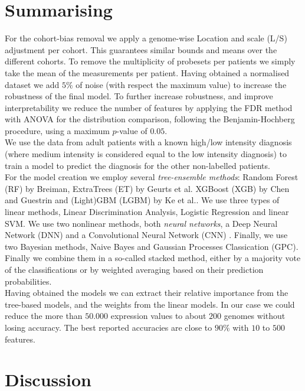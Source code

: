 \documentclass[a4paper,10pt]{article}
\begin{document}
\section{Summarising}
%
For the cohort-bias removal we apply a genome-wise Location and scale (L/S) adjustment per cohort. This guarantees similar bounds and means over the different cohorts. To remove the multiplicity of probesets per patients we simply take the mean of the measurements per patient. Having obtained a normalised dataset we add $5\%$ of noise (with respect the maximum value) to increase the robustness of the final model. To further increase robustness, and improve interpretability we reduce the number of features by applying the FDR method with ANOVA for the distribution comparison, following the Benjamin-Hochberg procedure, using a maximum $p$-value of $0.05$. \\
%
We use the data from adult patients with a known high/low intensity diagnosis (where medium intensity is considered equal to the low intensity diagnosis) to train a model to predict the diagnosis for the other non-labelled patients. \\
%
For the model creation we employ several \textit{tree-ensemble methods}: Random Forest (RF) by Breiman\cite{Breiman2001}, ExtraTrees (ET) by Geurts et al.\cite{Geurts2006} XGBoost (XGB) by Chen and Guestrin\cite{Chen2016} and (Light)GBM (LGBM) by Ke et al.\cite{Ke2017}. 
We use three types of linear methods, Linear Discrimination Analysis, Logistic Regression and linear SVM.
We use two nonlinear methods, both \textit{neural networks}, a Deep Neural Network (DNN) \cite{lecun2015deep} and a Convolutional Neural Network (CNN) \cite{Lecun98}. Finally, we use two Bayesian methods, Naive Bayes and Gaussian Processes Classication (GPC).\\ 
%
Finally we combine them in a so-called stacked method, either by a majority vote of the classifications or by weighted averaging based on their prediction probabilities. \\ 
%
Having obtained the models we can extract their relative importance from the tree-based models, and the weights from the linear models. In our case we could reduce the more than $50.000$ expression values to about $200$ genomes without losing accuracy. The best reported accuracies are close to $90\%$ with $10$ to $500$ features. 
%
\section{Discussion}
\end{document}

